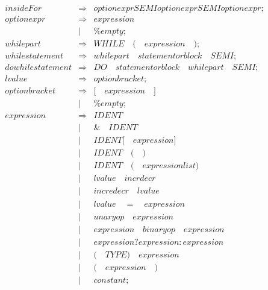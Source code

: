 \documentclass{article}
\begin{document}
\begin{eqnarray}
   \mathit{insideFor} & \Rightarrow&\mathit{optionexpr}\mathit{SEMI}\mathit{optionexpr}\mathit{SEMI}\mathit{optionexpr};\\
   \mathit{optionexpr} & \Rightarrow & \mathit{expression} \\
   &  | & \mathit{\%empty};\\
   \mathit{whilepart} & \Rightarrow & \mathit{WHILE}\quad \mathit{(} \quad \mathit{expression}\quad\mathit{)} ; \\
   \mathit{whilestatement} & \Rightarrow & \mathit{whilepart} \quad \mathit{statementorblock} \quad \mathit{SEMI} ; \\
   \mathit{dowhilestatement} & \Rightarrow & \mathit{DO} \quad \mathit{statementorblock} \quad \mathit{whilepart} \quad \mathit{SEMI} ; \\
   \mathit{lvalue} & \Rightarrow & \mathit{optionbracket} ; \\
   \mathit{optionbracket} & \Rightarrow & \mathit{[}\quad\mathit{expression}\quad\mathit{]}\\
   &|& \mathit{\%empty};\\
   \mathit{expression} & \Rightarrow & \mathit{IDENT}\\
    & | & \mathit{\&} \quad \mathit{IDENT}\\
    & | & \mathit{IDENT} \mathit{[}\quad\mathit{expression}\mathit{]}\\
    & | & \mathit{IDENT}\quad\mathit{(}\quad\mathit{)} \\
    & | & \mathit{IDENT} \quad \mathit{(} \quad\mathit{expressionlist} \mathit{)}\\
    & | & \mathit{lvalue} \quad \mathit{incrdecr} \\
    & | & \mathit{incredecr} \quad \mathit{lvalue} \\
    & | & \mathit{lvalue} \quad \mathit{=} \quad \mathit{expression}\\
    & | & \mathit{unaryop} \quad \mathit{expression}\\
    & | & \mathit{expression} \quad \mathit{binaryop} \quad \mathit{expression}\\
    & | & \mathit{expression} \mathit{?} \mathit{expression}\mathit{:}\mathit{expression}\\
    & | & \mathit{(}\quad\mathit{TYPE}\mathit{)}\quad\mathit{expression}\\
    & | & \mathit{(}\quad\mathit{expression}\quad\mathit{)}\\
    & | & \mathit{constant} ; \\

\end{eqnarray}
\end{document}
